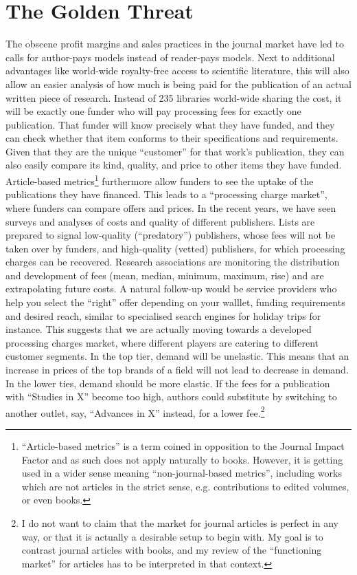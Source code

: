 \documentclass[12pt]{article}
\begin{document}
\section{The Golden Threat}
The obscene profit margins and sales practices in the journal market have led to calls for author-pays models instead of reader-pays models. Next to additional advantages like world-wide royalty-free access to scientific literature, this will also allow an easier analysis of how much is being paid for the publication of an actual written piece of research. Instead of 235 libraries world-wide sharing the cost, it will be exactly one funder who will pay processing fees for exactly one publication. That funder will know precisely what they have funded, and they can check whether that item conforms to their specifications and requirements. Given that they are the unique ``customer'' for that work's publication, they can also easily compare its kind, quality, and price to other items they have funded. Article-based metrics\footnote{``Article-based metrics''
 is a term coined in opposition to the Journal Impact Factor and as such does not apply naturally to books. However, it is getting used in a wider sense meaning ``non-journal-based metrics'', including works which are not articles in the strict sense, e.g. contributions to edited volumes, or even books.
 } furthermore allow funders to see the uptake of the publications they have financed. This leads to a ``processing charge market'', where funders can compare offers and prices. In the recent years, we have seen surveys and analyses of costs and quality of different publishers. Lists are prepared to signal low-quality (``predatory'') publishers, whose fees will not be taken over by funders,  and high-quality (vetted) publishers, for which processing charges can be recovered. Research associations are monitoring the distribution and development of fees (mean, median, minimum, maximum, rise) %
 and are extrapolating future costs. A natural follow-up would be service providers who help you select the ``right'' offer depending on your walllet, funding requirements and desired reach, similar to specialised search engines for holiday trips for instance. This suggests that we are actually moving towards a developed processing charges market, where different players are catering to different customer segments. In the top tier, demand will be unelastic. This means that an increase in prices of the top brands of a field will not lead to decrease in demand.  In the lower ties, demand should be more elastic. If the fees for a publication with ``Studies in X'' become too high, authors could substitute by switching to another outlet, say, ``Advances in X'' instead, for a lower fee.\footnote{I do not want to claim that the market for journal articles is perfect in any way, or that it is actually a desirable setup to begin with. My goal is to contrast journal articles with books, and my review of the ``functioning market'' for articles has to be interpreted in that context.} 
 
\end{document}
